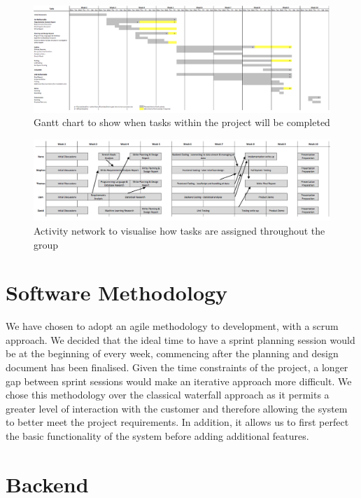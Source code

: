 \documentclass[11pt, oneside, a4paper]{article}
\begin{document}
\begin{figure}[h]
	\centering
		\includegraphics[width=500px]{GanttChart.png}
	\caption{Gantt chart to show when tasks within the project will be completed}
	\label{GanttChart}
\end{figure}

\begin{figure}[h]
	\centering
		\includegraphics[width=500px]{ActivityNetwork.png}
	\caption{Activity network to visualise how tasks are assigned throughout the group}
	\label{ActivityNetwork}
\end{figure}

\section{Software Methodology}

We have chosen to adopt an agile methodology to development, with
a scrum approach. We decided that the ideal time to have a sprint planning session
would be at the beginning of every week, commencing after the planning and design
document has been finalised. Given the time constraints of the project, a longer
gap between sprint sessions would make an iterative approach more difficult. We
chose this methodology over the classical waterfall approach as it permits a greater
level of interaction with the customer and therefore allowing the system to better
meet the project requirements. In addition, it allows us to first perfect the basic
functionality of the system before adding additional features.

\section{Backend}
\end{document}
